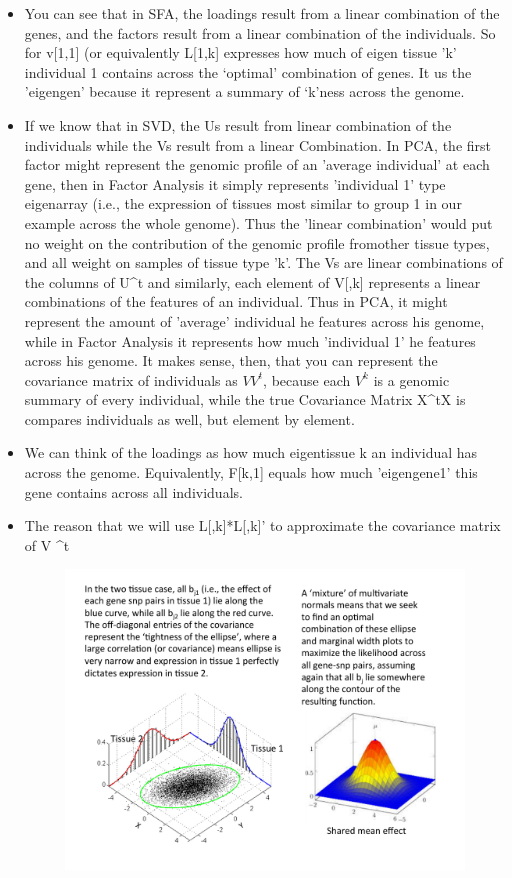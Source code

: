 \documentclass[10pt]{article}
\begin{document}
{\begin{itemize}
\item You can see that in SFA, the loadings result from a linear combination of the genes, and the factors result from a linear combination of the individuals. So for v[1,1] (or equivalently L[1,k] expresses how much of eigen tissue 'k' individual 1 contains across the `optimal' combination of genes. It us the 'eigengen' because it represent a summary of `k'ness across the genome.
\item If we know that in SVD, the Us result from linear combination of the individuals while the Vs result from a linear Combination. In PCA, the first factor might represent the genomic profile of an 'average individual' at each gene, then in Factor Analysis it simply represents 'individual 1' type eigenarray (i.e., the expression of tissues most similar to group 1 in our example across the whole genome). Thus the 'linear combination' would put no weight on the contribution of the genomic profile fromother tissue types, and all weight on samples of tissue type 'k'. The Vs are linear combinations of the columns of U^{t} and similarly, each element of V[,k] represents a linear combinations of the features of an individual. Thus in PCA, it might represent the amount of 'average' individual he features across his genome, while in Factor Analysis it represents how much 'individual 1' he features across his genome. It makes sense, then, that you can represent the covariance matrix of individuals as $VV^{t}$, because each $V^{k}$ is a genomic summary of every individual, while the true Covariance Matrix X^{t}X is compares individuals as well, but element by element.
\item We can think of the loadings as how much eigentissue k an individual has across the genome. Equivalently, F[k,1]  equals how much 'eigengene1' this gene contains across all individuals.
\item The reason that we will use L[,k]*L[,k]' to approximate the covariance matrix of V
^t

\begin{figure}[h]
    \includegraphics[scale=0.5]{multidensity.pdf}
\end{figure}


\end{itemize}}
\end{document}
